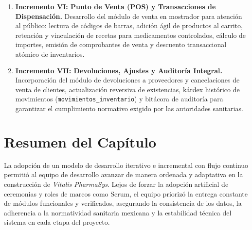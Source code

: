 \begin{enumerate}
    \item \textbf{Incremento VI: Punto de Venta (POS) y Transacciones de Dispensación.}
    Desarrollo del módulo de venta en mostrador para atención al público: lectura de códigos de barras, adición ágil de productos al carrito, retención y vinculación de recetas para medicamentos controlados, cálculo de importes, emisión de comprobantes de venta y descuento transaccional atómico de inventarios.
    
    \item \textbf{Incremento VII: Devoluciones, Ajustes y Auditoría Integral.}
    Incorporación del módulo de devoluciones a proveedores y cancelaciones de venta de clientes, actualización reversiva de existencias, kárdex histórico de movimientos (\texttt{movimientos\_inventario}) y bitácora de auditoría para garantizar el cumplimiento normativo exigido por las autoridades sanitarias.
\end{enumerate}

\section{Resumen del Capítulo}

La adopción de un modelo de desarrollo iterativo e incremental con flujo continuo permitió al equipo de desarrollo avanzar de manera ordenada y adaptativa en la construcción de \textit{Vitalis PharmaSys}. Lejos de forzar la adopción artificial de ceremonias y roles de marcos como Scrum, el equipo priorizó la entrega constante de módulos funcionales y verificados, asegurando la consistencia de los datos, la adherencia a la normatividad sanitaria mexicana y la estabilidad técnica del sistema en cada etapa del proyecto.